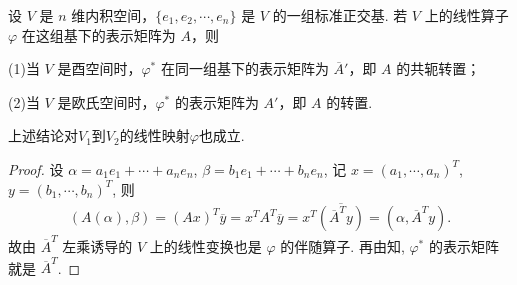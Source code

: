 \documentclass[../../main.tex]{subfiles}%
\begin{document}
\begin{theorem}\label{theorem:伴随算子的矩阵}
设 $V$ 是 $n$ 维内积空间，$\{e_1,e_2,\cdots,e_n\}$ 是 $V$ 的一组标准正交基. 若 $V$ 上的线性算子 $\varphi$ 在这组基下的表示矩阵为 $A$，则

(1)当 $V$ 是酉空间时，$\varphi^*$ 在同一组基下的表示矩阵为 $\overline{A}'$，即 $A$ 的共轭转置；

(2)当 $V$ 是欧氏空间时，$\varphi^*$ 的表示矩阵为 $A'$，即 $A$ 的转置.
\end{theorem}
\begin{remark}
上述结论对$V_1$到$V_2$的线性映射$\varphi $也成立.
\end{remark}
\begin{proof}

设 $\alpha=a_1e_1+\cdots+a_ne_n$, $\beta=b_1e_1+\cdots+b_ne_n$, 记 $x=(a_1,\cdots,a_n)^T$, $y=(b_1,\cdots,b_n)^T$, 则
\begin{align*}
(A(\alpha),\beta)=(Ax)^T\overline{y}=x^TA^T\overline{y}=x^T\overline{(\overline{A}^Ty)}=(\alpha,\overline{A}^Ty).
\end{align*}
故由 $\overline{A}^T$ 左乘诱导的 $V$ 上的线性变换也是 $\varphi$ 的伴随算子. 再由知, $\varphi^*$ 的表示矩阵就是 $\overline{A}^T$.

\end{proof}
\end{document}
